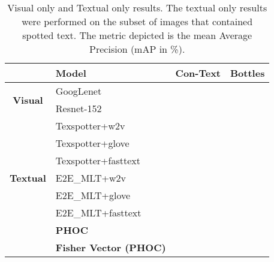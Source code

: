 \documentclass[10pt,twocolumn,letterpaper]{article}
\begin{document}
\begin{table}[H]
\begin{center}
\small
\begin{tabular}{c|l|l|l}
\multicolumn{1}{l|}{}       & \textbf{Model}         & \textbf{Con-Text} & \textbf{Bottles} \\ \hline
\multirow{2}{*}{\textbf{Visual}} & GoogLenet              &              &             \\
                            & Resnet-152             &               &             \\ \hline
\multirow{7}{*}{\textbf{Textual}} & Texspotter+w2v         &              &             \\
                            & Texspotter+glove       &              &             \\
                            & Texspotter+fasttext    &               &              \\
                            & E2E\_MLT+w2v           &              &             \\
                            & E2E\_MLT+glove         &              &             \\
                            & E2E\_MLT+fasttext      &              &             \\
                            & \textbf{PHOC}          & \boldmath    & \boldmath   \\ \cline{2-4} 
\multicolumn{1}{l|}{}       & \textbf{Fisher Vector (PHOC)} & \boldmath    & \boldmath \\ \hline
\end{tabular}
\end{center}
\caption{Visual only and Textual only results. The textual only results were performed on the subset of images that contained spotted text. The metric depicted is the mean Average Precision (mAP in \%).}
\label{tab:results1}
\end{table}
\end{document}
